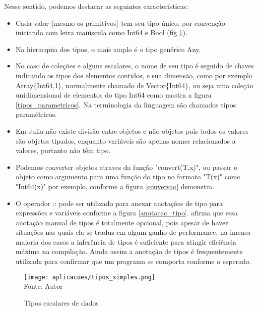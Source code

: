 Nesse sentido, podemos destacar as seguintes características: 
\begin{itemize}
    \item Cada valor (mesmo os primitivos) tem seu tipo único, por convenção iniciando com letra maiúscula como Int64 e Bool (fig \ref{tipos_escalares}). 
    \item Na hierarquia dos tipos, o mais amplo é o tipo genérico Any.
    \item No caso de coleções e alguns escalares, o nome de seu tipo é seguido de chaves indicando os tipos dos elementos contidos, e sua dimensão, como por exemplo Array\{Int64,1\}, normalmente chamado de Vector\{Int64\}, ou seja uma coleção unidimensional de elementos do tipo Int64 como mostra a figura \ref{tipos_parametricos}. Na terminologia da linguagem são chamados tipos paramétricos.  
    \item Em Julia não existe divisão entre objetos e não-objetos pois todos os valores são objetos tipados, enquanto variáveis são apenas nomes relacionados a valores, portanto não têm tipo. 
    \item Podemos converter objetos atraves da função "convert(T,x)", ou passar o objeto como argumento para uma função do tipo no formato "T(x)" como "Int64(x)" por exemplo, conforme a figura \ref{conversao} demonstra. 
    \item O operador :: pode ser utilizado para anexar anotações de tipo para expressões e variáveis conforme a figura \ref{anotacao_tipo}. \cite{Bezanson2017} afirma que essa anotação manual de tipos é totalmente opcional, pois apesar de haver situações nas quais ela se traduz em algum ganho de performance, na imensa maioria dos casos a inferência de tipos é suficiente para atingir eficiência máxima na compilação. Ainda assim a anotação de tipos é frequentemente utilizada para confirmar que um programa se comporta conforme o esperado. \label{anotacao_tipos}
    
\end{itemize}


    \begin{figure}[H]
    \begin{center}
        \caption{Tipos escalares de dados} \label{tipos_escalares}
        \texttt{[image: aplicacoes/tipos\_simples.png]} \\
        {\tiny \sf Fonte: Autor}
    \end{center}
    \end{figure} 

